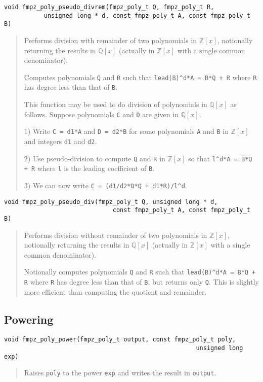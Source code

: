 \documentclass[a4paper,10pt]{article}
\newcommand{\Z}{\mathbb{Z}}
\newcommand{\Q}{\mathbb{Q}}
\newcommand{\code}{\lstinline}
\begin{document}
\begin{lstlisting}
void fmpz_poly_pseudo_divrem(fmpz_poly_t Q, fmpz_poly_t R, 
           unsigned long * d, const fmpz_poly_t A, const fmpz_poly_t B)
\end{lstlisting}
\begin{quote}
Performs division with remainder of two polynomials in $\Z[x]$, notionally returning the results in $\Q[x]$ (actually in $\Z[x]$ with a single common denominator).

Computes polynomials \code{Q} and \code{R} such that \code{lead(B)^d*A = B*Q + R} where \code{R} has degree less than that of \code{B}.

This function may be used to do division of polynomials in $\Q[x]$ as follows. Suppose polynomials \code{C} and \code{D} are given in $\Q[x]$. 

1) Write \code{C = d1*A} and \code{D = d2*B} for some polynomials \code{A} and \code{B} in $\Z[x]$ and integers \code{d1} and \code{d2}.

2) Use pseudo-division to compute \code{Q} and \code{R} in $\Z[x]$ so that \code{l^d*A = B*Q + R} where \code{l} is the leading coefficient of \code{B}. 

3) We can now write \code{C = (d1/d2*D*Q + d1*R)/l^d}.
\end{quote}

\begin{lstlisting}
void fmpz_poly_pseudo_div(fmpz_poly_t Q, unsigned long * d, 
                              const fmpz_poly_t A, const fmpz_poly_t B)
\end{lstlisting}
\begin{quote}
Performs division without remainder of two polynomials in $\Z[x]$, notionally returning the results in $\Q[x]$ (actually in $\Z[x]$ with a single common denominator).

Notionally computes polynomials \code{Q} and \code{R} such that \code{lead(B)^d*A = B*Q + R} where \code{R} has degree less than that of \code{B}, but returns only \code{Q}. This is slightly more efficient than computing the quotient and remainder.
\end{quote}

\subsection{Powering}

\begin{lstlisting}
void fmpz_poly_power(fmpz_poly_t output, const fmpz_poly_t poly, 
                                                     unsigned long exp) 
\end{lstlisting}
\begin{quote}
Raises \code{poly} to the power \code{exp} and writes the result in \code{output}.
\end{quote}
\end{document}
